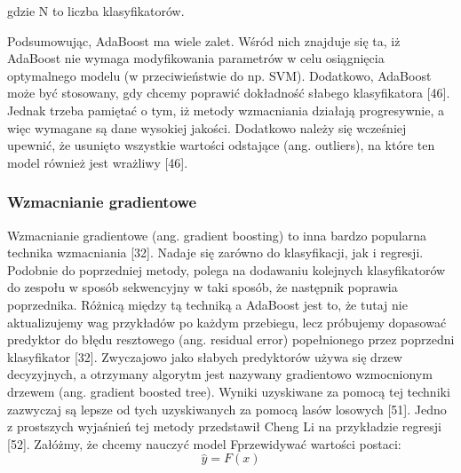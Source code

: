 \noindent gdzie N to liczba klasyfikatorów. 

Podsumowując, AdaBoost ma wiele zalet. Wśród nich znajduje się ta, iż AdaBoost nie wymaga modyfikowania parametrów w celu osiągnięcia optymalnego modelu (w przeciwieństwie do np. SVM). Dodatkowo, AdaBoost może być stosowany, gdy chcemy poprawić dokładność słabego klasyfikatora [46]. Jednak trzeba pamiętać o tym, iż metody wzmacniania działają progresywnie, a więc wymagane są dane wysokiej jakości. Dodatkowo należy się wcześniej upewnić, że usunięto wszystkie wartości odstające (ang. outliers), na które ten model również jest wrażliwy [46]. 

\subsubsection{Wzmacnianie gradientowe}
\label{cha:Wzmacnianie gradientowe}

Wzmacnianie gradientowe (ang. gradient boosting) to inna bardzo popularna technika wzmacniania [32]. Nadaje się zarówno do klasyfikacji, jak i regresji. Podobnie do poprzedniej metody, polega na dodawaniu kolejnych klasyfikatorów do zespołu w sposób sekwencyjny w taki sposób, że następnik poprawia poprzednika. Różnicą między tą techniką a AdaBoost jest to, że tutaj nie aktualizujemy wag przykładów po każdym przebiegu, lecz próbujemy dopasować predyktor do błędu resztowego (ang. residual error) popełnionego przez poprzedni klasyfikator [32]. Zwyczajowo jako słabych predyktorów używa się drzew decyzyjnych, a otrzymany algorytm jest nazywany gradientowo wzmocnionym drzewem (ang. gradient boosted tree). Wyniki uzyskiwane za pomocą tej techniki zazwyczaj są lepsze od tych uzyskiwanych za pomocą lasów losowych [51]. Jedno z prostszych wyjaśnień tej metody przedstawił Cheng Li na przykładzie regresji [52]. Załóżmy, że chcemy nauczyć model Fprzewidywać wartości postaci:
\begin{equation}
\hat y = F(x)
\end{equation}


